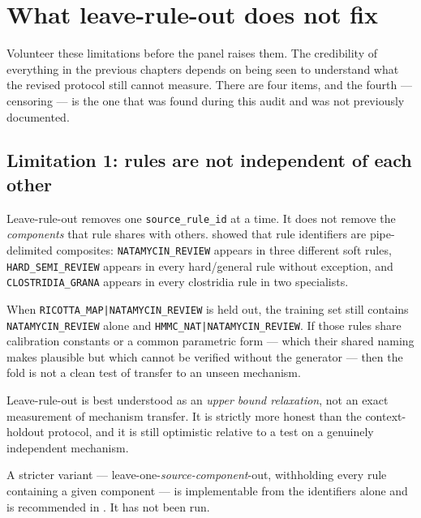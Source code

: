 \chapter{What leave-rule-out does not fix}
\label{ch:limits}

\begin{saybox}[title={What to say at the start of this section}]
Volunteer these limitations before the panel raises them. The credibility
of everything in the previous chapters depends on being seen to understand
what the revised protocol still cannot measure. There are four items, and
the fourth --- censoring --- is the one that was found during this audit
and was not previously documented.
\end{saybox}

\section{Limitation 1: rules are not independent of each other}

Leave-rule-out removes one \texttt{source\_rule\_id} at a time. It does not
remove the \emph{components} that rule shares with others.
 showed that rule identifiers are pipe-delimited
composites: \texttt{NATAMYCIN\_REVIEW} appears in three different soft
rules, \texttt{HARD\_SEMI\_REVIEW} appears in every hard/general rule
without exception, and \texttt{CLOSTRIDIA\_GRANA} appears in every
clostridia rule in two specialists.

When \texttt{RICOTTA\_MAP|NATAMYCIN\_REVIEW} is held out, the training set
still contains \texttt{NATAMYCIN\_REVIEW} alone and
\texttt{HMMC\_NAT|NATAMYCIN\_REVIEW}. If those rules share calibration
constants or a common parametric form --- which their shared naming makes
plausible but which cannot be verified without the generator --- then the
fold is not a clean test of transfer to an unseen mechanism.

\begin{limitbox}[title={Consequence}]
Leave-rule-out is best understood as an \emph{upper bound relaxation}, not
an exact measurement of mechanism transfer. It is strictly more honest than
the context-holdout protocol, and it is still optimistic relative to a
test on a genuinely independent mechanism.

A stricter variant --- leave-one-\emph{source-component}-out, withholding
every rule containing a given component --- is implementable from the
identifiers alone and is recommended in . It has not
been run.
\end{limitbox}

